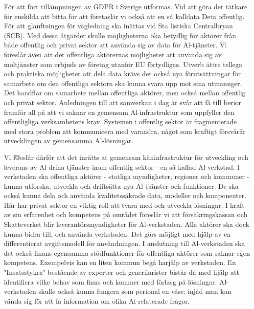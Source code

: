 {För att fört tillämpningen av GDPR i Sverige utformas. Vid att göra det tätkare för enskilda att bitta för att företaslär vi också att en så kalldata Deta offentlig.
För att glauftningen för vägledning ska inättas vid Sta listiska Centralbryan (SCB). Med dessa åtgärder skulle möjligheterna öka betydlig för aktörer från både offentlig och privat sektor att använda sig av data för Al-tjänster. Vi föreslår även att det offentliga aktörernas möjligheter att använda sig av moltjänster som erbjuds av företag utanför EU förtydligas.
Utverb ättre tellega och praktiska möjligheter att dela data krävs det också nya förutsättningar för samarbete om den offentliga sektorn ska kunna svara upp mot sina utmannger. Det handflar om samarbete mellan offentliga aktörer, men också mellan offentlig och privat sektor. Anledningen till att samverkan i dag är svår att få till berior framför all på att vi saknar en gemensam Al-infrastruktur som uppfyller den offentligliga verksamhetens krav. Systemen i offentlig sektor är fragmenterade med stora problem att kommunicera med varandra, något som kraftigt försvårår utvecklingen av gemensamma Al-lösningar.

Vi f®eslår dårför att det inrätts at gemensam käninfrastruktur för utveckling och leverans av Al-drina tjänster inom offentlig sektor - en så kallad Al-verkstad. I verkstaden ska offentliga aktörer - statliga myndigheter, regioner och kommuner - kunna utforska, utveckla och driftsätta nya Al-tjänster och funktioner. De ska också kunna dela och använda kvalitetssäkrade data, modeller och komponenter. Hår har privat sektor en viktig roll att tvara med och utveckla lösningar.
I kraft av sin erfarenhet och kompetens på området föreslår vi att försäkringskassan och Skatteverket blir leverantörsmyndigheter för Al-verkstaden. Alla aktörer ska dock kunna bidra till, och använda verkstaden. Det görs möjligt med hjälp av en differentierat avgiftsmodell för användningen. I anslutning till Al-verkstaden ska det också finans egensamma stödfunktioner för offentliga aktörer som saknar egen kompetens. Exempelvis kan en liten kommun begå harjälp av verkstaden. En "Insatsstykra" bestående av experter och generilarister bistår då med hjälp att identifiera vilke behav som finns och kommer med förlasg på lösningar. Al-verkstaden skulle också kunna fungera som perional en våse: injåd man kan vända sig för att få information om olika Al-relaterade frågor.
}
